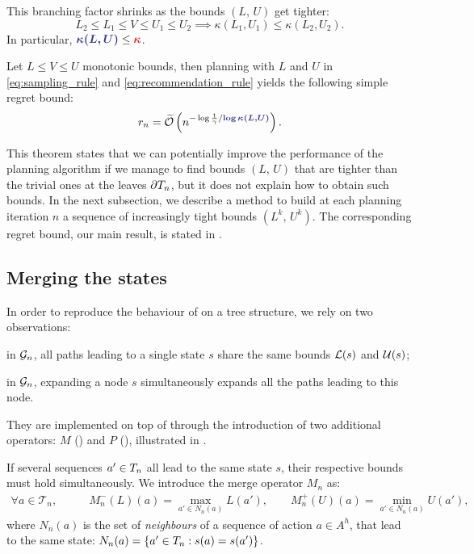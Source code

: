 \documentclass[runningheads]{llncs}
\begin{document}
\begin{lemma}This branching factor shrinks as the bounds $(L,\,U)$ get tighter:
\[L_2\leq L_1\leq V\leq U_1\leq U_2\implies \kappa(L_1,U_1) \leq \kappa(L_2,U_2).\]
In particular, $\hlbb{\kappa(L,U)} \leq \hlrb{\kappa}$.
\end{lemma}

\begin{theorem}
\label{thm:regret-bound-U}
Let $L \leq V\leq U$ monotonic bounds, then planning with $L$ and $U$ in \eqref{eq:sampling_rule} and \eqref{eq:recommendation_rule} yields the following simple regret bound:
\begin{equation*}
r_n = \tilde{\cO}\left(n^{-\log \frac{1}{\gamma}/\hlbb{\log \kappa(L,U)}}\right).
\end{equation*}
\end{theorem}


This theorem states that we can potentially improve the performance of the planning algorithm if we manage to find bounds $(L,\, U)$ that are tighter than the trivial ones at the leaves ${\partial T_n}$, but it does not explain how to obtain such bounds. In the next subsection, we describe a method to build at each planning iteration $n$ a sequence of increasingly tight bounds $(L^k,\, U^k)$. The corresponding regret bound, our main result, is stated in .


\subsection{Merging the states}

In order to reproduce the behaviour of  on a tree structure, we rely on two observations: \begin{enumerate*}[label=(\roman*)]
	\item in $\mathcal{G}_n$, all paths leading to a single state $s$ share the same bounds $\mathcal{L}(s)$ and $\mathcal{U}(s)$;
	\item in $\mathcal{G}_n$, expanding a node $s$ simultaneously expands all the paths leading to this node.
\end{enumerate*}
They are implemented on top of  through the introduction of two additional operators: $M$ () and $P$ (),  illustrated in .

\begin{definition}
	\label{def:merge}
If several sequences $a'\in T_n$ all lead to the same state $s$, their respective bounds must hold simultaneously. We introduce the merge operator $M_n$ as:
    \begin{align}
    \label{eq:merge}
        \forall a\in\mathcal{T}_n, \qquad &M_n^-(L)(a) = \max_{a'\in N_n(a)} L(a'),\qquad M_n^+(U)(a) = \min_{a'\in N_n(a)} U(a'),                                   
    \end{align}
    where $N_n(a)$ is the set of \emph{neighbours} of a sequence of action $a\in A^h$, that lead to the same state:  $N_n(a) = \{a'\in T_n: s(a)=s(a')\}$.
\end{definition}
\end{document}
